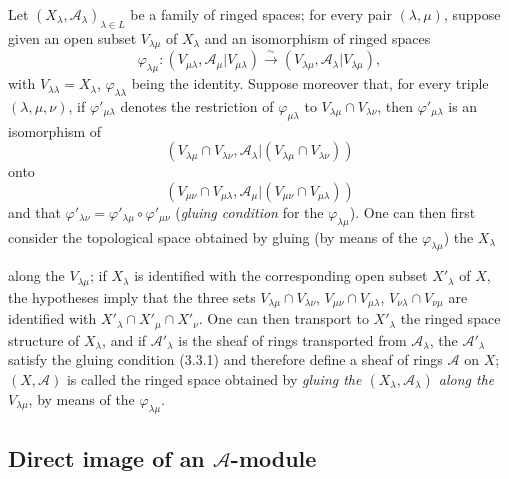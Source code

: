 \begin{env}[4.1.7]
\label{0.4.1.7}
Let $(X_\lambda,\mathcal{A}_\lambda)_{\lambda\in L}$ be a family of ringed
spaces; for every pair $(\lambda,\mu)$, suppose given an open subset
$V_{\lambda\mu}$ of $X_\lambda$ and an isomorphism of ringed spaces
\[
  \varphi_{\lambda\mu}:
  (V_{\mu\lambda},\mathcal{A}_\mu|V_{\mu\lambda})
  \xrightarrow{\sim}
  (V_{\lambda\mu},\mathcal{A}_\lambda|V_{\lambda\mu}),
\]
with $V_{\lambda\lambda}=X_\lambda$, $\varphi_{\lambda\lambda}$ being
the identity. Suppose moreover that, for every triple $(\lambda,\mu,\nu)$, if
$\varphi'_{\mu\lambda}$ denotes the restriction of
$\varphi_{\mu\lambda}$ to $V_{\lambda\mu}\cap V_{\lambda\nu}$, then
$\varphi'_{\mu\lambda}$ is an isomorphism of
\[
  (V_{\lambda\mu}\cap V_{\lambda\nu},
   \mathcal{A}_\lambda|(V_{\lambda\mu}\cap V_{\lambda\nu}))
\]
onto
\[
  (V_{\mu\nu}\cap V_{\mu\lambda},
   \mathcal{A}_\mu|(V_{\mu\nu}\cap V_{\mu\lambda}))
\]
and that
$\varphi'_{\lambda\nu}=\varphi'_{\lambda\mu}\circ\varphi'_{\mu\nu}$
(\emph{gluing condition} for the $\varphi_{\lambda\mu}$). One can then
first consider the topological space obtained by gluing (by
means of the $\varphi_{\lambda\mu}$) the $X_\lambda$

along the $V_{\lambda\mu}$; if $X_\lambda$ is identified with the corresponding open
subset $X'_\lambda$ of $X$, the hypotheses imply that the three
sets $V_{\lambda\mu}\cap V_{\lambda\nu}$,
$V_{\mu\nu}\cap V_{\mu\lambda}$,
$V_{\nu\lambda}\cap V_{\nu\mu}$ are identified with
$X'_\lambda\cap X'_\mu\cap X'_\nu$. One can then transport to
$X'_\lambda$ the ringed space structure of $X_\lambda$, and if
$\mathcal{A}'_\lambda$ is the sheaf of rings transported from
$\mathcal{A}_\lambda$, the $\mathcal{A}'_\lambda$ satisfy the gluing
condition (3.3.1) and therefore define a sheaf of rings $\mathcal{A}$ on
$X$; $(X,\mathcal{A})$ is called the ringed space obtained by
\emph{gluing the $(X_\lambda,\mathcal{A}_\lambda)$ along the
$V_{\lambda\mu}$}, by means of the $\varphi_{\lambda\mu}$.
\end{env}

\subsection{Direct image of an $\mathcal{A}$-module}
\label{subsection:0.4.2}

